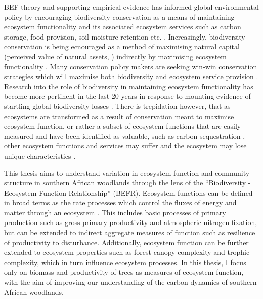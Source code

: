 \begin{refsection}
BEF theory and supporting empirical evidence has informed global environmental policy by encouraging biodiversity conservation as a means of maintaining ecosystem functionality and its associated ecosystem services such as carbon storage, food provision, soil moisture retention etc. \citep{Balvanera2014, Naeem2012}. Increasingly, biodiversity conservation is being ecnouraged as a method of maximising natural capital (perceived value of natural assets, \citealt{Kareiva2011}) indirectly by maximising ecosystem functionality \citep{Scherer-Lorenzen2014, Cardinale2012}. Many conservation policy makers are seeking win-win conservation strategies which will maximise both biodiversity and ecosystem service provision \citep{Howe2014, Adams2004}. Research into the role of biodiversity in maintaining ecosystem functionality has become more pertinent in the last 20 years in response to mounting evidence of startling global biodiversity losses \citep{McRae2017, Butchart2010, Vitousek1997}. There is trepidation however, that as ecosystems are transformed as a result of conservation meant to maximise ecosystem function, or rather a subset of ecosystem functions that are easily measured and have been identified as valuable, such as carbon sequestration \citep{Duffy2017}, other ecosystem functions and services may suffer and the ecosystem may lose unique characteristics \citep{Brockerhoff2017, Srivastava2005a}. 

This thesis aims to understand variation in ecosystem function and community structure in southern African woodlands through the lens of the ``Biodiversity - Ecosystem Function Relationship'' (BEFR). Ecosystem functions can be defined in broad terms as the rate processes which control the fluxes of energy and matter through an ecosystem \citep{Jax2005}. This includes basic processes of primary production such as gross primary productivity and atmospheric nitrogen fixation, but can be extended to indirect aggregate measures of function such as resilience of productivity to disturbance. Additionally, ecosystem function can be further extended to ecosystem properties such as forest canopy complexity and trophic complexity, which in turn influence ecosystem processes. In this thesis, I focus only on biomass and productivity of trees as measures of ecosystem function, with the aim of improving our understanding of the carbon dynamics of southern African woodlands.


\end{refsection}
